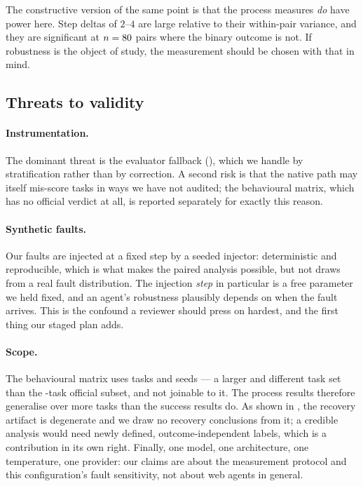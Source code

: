 The constructive version of the same point is that the process measures
\emph{do} have power here. Step deltas of $2$--$4$ are large relative to their
within-pair variance, and they are significant at $n=80{}$ pairs
where the binary outcome is not. If robustness is the object of study, the
measurement should be chosen with that in mind.

\subsection{Threats to validity}
\label{sec:threats}

\paragraph{Instrumentation.} The dominant threat is the evaluator fallback
(), which we handle by stratification rather than by
correction. A second risk is that the native path may itself mis-score tasks in
ways we have not audited; the behavioural matrix, which has no official verdict at
all, is reported separately for exactly this reason.

\paragraph{Synthetic faults.} Our faults are injected at a fixed step by a seeded
injector: deterministic and reproducible, which is what makes the paired analysis
possible, but not draws from a real fault distribution. The injection \emph{step}
in particular is a free parameter we held fixed, and an agent's robustness
plausibly depends on when the fault arrives. This is the confound a reviewer
should press on hardest, and the first thing our staged plan adds.

\paragraph{Scope.} The behavioural matrix uses \MatrixTasks{} tasks and
\TrialsPerCell{} seeds --- a larger and different task set than the
\OfficialTasks{}-task official subset, and not joinable to it. The process results
therefore generalise over more tasks than the success results do. As shown in
, the recovery artifact is degenerate and we draw no
recovery conclusions from it; a credible analysis would need newly defined,
outcome-independent labels, which is a contribution in its own right. Finally,
one model, one architecture, one temperature, one provider: our claims are about
the measurement protocol and this configuration's fault sensitivity, not about web
agents in general.
